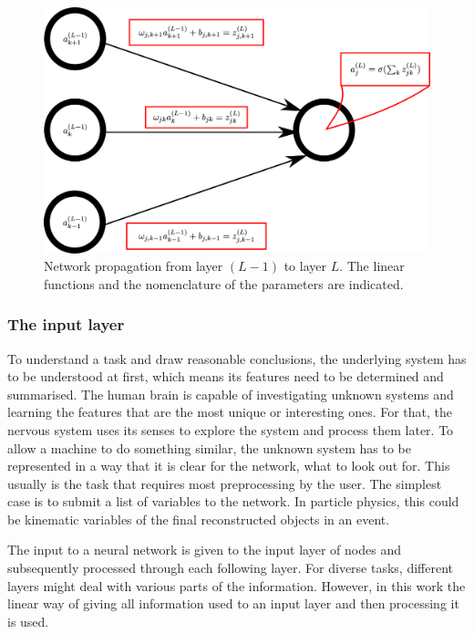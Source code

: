 \begin{figure}[htbp]
	\centering
	\includegraphics[scale=0.18]{figures_ML/nodes_nomenclature.eps}
	\caption[Network parameter nomenclature]{Network propagation from layer $(L-1)$ to layer $L$. The linear functions and the nomenclature of the parameters are indicated.}
	\label{fig:nodes_nomenclature}
\end{figure}


\subsubsection{The input layer}

To understand a task and draw reasonable conclusions, the underlying system has to be understood at first, which means its features need to be determined and summarised. The human brain is capable of investigating unknown systems and learning the features that are the most unique or interesting ones. For that, the nervous system uses its senses to explore the system and process them later. To allow a machine to do something similar, the unknown system has to be represented in a way that it is clear for the network, what to look out for. This usually is the task that requires most preprocessing by the user. The simplest case is to submit a list of variables to the network. In particle physics, this could be kinematic variables of the final reconstructed objects in an event.

The input to a neural network is given to the input layer of nodes and subsequently processed through each following layer. For diverse tasks, different layers might deal with various parts of the information. However, in this work the linear way of giving all information used to an input layer and then processing it is used.

